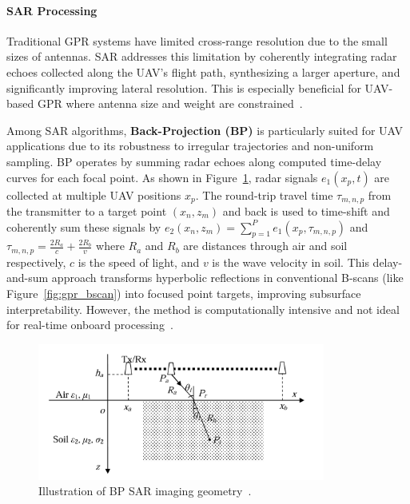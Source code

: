\paragraph{\gls{SAR} Processing}

Traditional \gls{GPR} systems have limited cross-range resolution due to the small sizes of antennas. \gls{SAR} addresses this limitation by coherently integrating radar echoes collected along the \gls{UAV}’s flight path, synthesizing a larger aperture, and significantly improving lateral resolution. This is especially beneficial for \gls{UAV}-based \gls{GPR} where antenna size and weight are constrained~\cite{9758040}.

Among \gls{SAR} algorithms, \textbf{Back-Projection (\gls{BP})} is particularly suited for \gls{UAV} applications due to its robustness to irregular trajectories and non-uniform sampling. \gls{BP} operates by summing radar echoes along computed time-delay curves for each focal point. As shown in Figure~\ref{fig:bp_geometry}, radar signals $e_1(x_p, t)$ are collected at multiple \gls{UAV} positions $x_p$. The round-trip travel time $\tau_{m,n,p}$ from the transmitter to a target point $(x_n, z_m)$ and back is used to time-shift and coherently sum these signals by \(e_2(x_n, z_m) = \sum_{p=1}^{P} e_1(x_p, \tau_{m,n,p})\) and \(\tau_{m,n,p} = \frac{2R_a}{c} + \frac{2R_b}{v}\) where $R_a$ and $R_b$ are distances through air and soil respectively, $c$ is the speed of light, and $v$ is the wave velocity in soil. This delay-and-sum approach transforms hyperbolic reflections in conventional B-scans (like Figure~\ref{fig:gpr_bscan}) into focused point targets, improving subsurface interpretability. However, the method is computationally intensive and not ideal for real-time onboard processing~\cite{lei2014multi}.

\begin{figure}[H]
    \centering
    \includegraphics[height=4.5cm]{figs/Huirui/bp_geometry.png}
    \caption{Illustration of BP SAR imaging geometry~\cite{lei2014multi}.}
    \label{fig:bp_geometry}
\end{figure}


